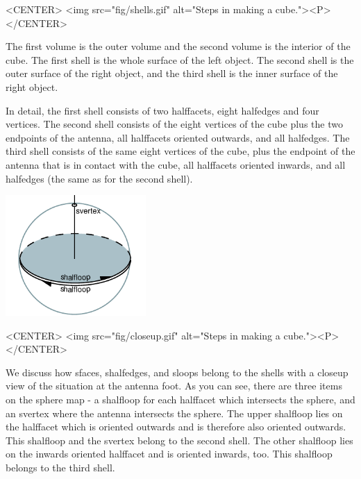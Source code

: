 \begin{ccHtmlOnly}
    <CENTER>
        <img src="fig/shells.gif" alt="Steps in making a cube."><P>
    </CENTER>
\end{ccHtmlOnly}


The first volume is the outer volume and the second volume is the
interior of the cube. The first shell is the whole surface of the left
object. The second shell is the outer surface of the right object, and
the third shell is the inner surface of the right object. 

In detail, the first shell consists of two halffacets, eight halfedges
and four vertices. The second shell consists of the eight vertices of
the cube plus the two endpoints of the antenna, all halffacets
oriented outwards, and all halfedges. The third shell consists of the
same eight vertices of the cube, plus the endpoint of the antenna
that is in contact with the cube, all halffacets
oriented inwards, and all halfedges (the same as for the second shell).

\begin{ccTexOnly}
    \begin{center}
      \parbox{0.4\textwidth}{%
          \includegraphics[width=0.4\textwidth]{Nef_3/fig/closeup}%
      }
    \end{center}
\end{ccTexOnly}

\begin{ccHtmlOnly}
    <CENTER>
        <img src="fig/closeup.gif" alt="Steps in making a cube."><P>
    </CENTER>
\end{ccHtmlOnly}

We discuss how sfaces, shalfedges, and sloops belong to the shells
with a closeup view of the situation at the antenna foot. As you can
see, there are three items on the sphere map - a shalfloop for each
halffacet which intersects the sphere, and an svertex where the
antenna intersects the sphere. The upper shalfloop lies on the 
halffacet which is oriented outwards and is therefore also 
oriented outwards. This shalfloop and the svertex belong to the
second shell.
The other shalfloop lies on the inwards oriented halffacet and is 
oriented inwards, too. This shalfloop belongs to the third shell. 

